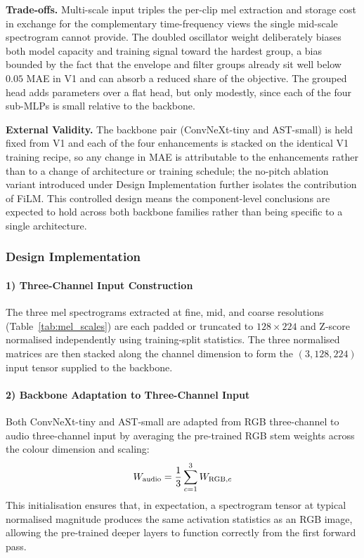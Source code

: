 \par \vspace{0.3cm}
\noindent\textbf{Trade-offs.} Multi-scale input triples the per-clip mel extraction and storage cost in exchange for the complementary time-frequency views the single mid-scale spectrogram cannot provide. The doubled oscillator weight deliberately biases both model capacity and training signal toward the hardest group, a bias bounded by the fact that the envelope and filter groups already sit well below $0.05$ MAE in V1 and can absorb a reduced share of the objective. The grouped head adds parameters over a flat head, but only modestly, since each of the four sub-MLPs is small relative to the backbone.

\par \vspace{0.3cm}
\noindent\textbf{External Validity.} The backbone pair (ConvNeXt-tiny and AST-small) is held fixed from V1 and each of the four enhancements is stacked on the identical V1 training recipe, so any change in MAE is attributable to the enhancements rather than to a change of architecture or training schedule; the no-pitch ablation variant introduced under Design Implementation further isolates the contribution of FiLM. This controlled design means the component-level conclusions are expected to hold across both backbone families rather than being specific to a single architecture.

\subsubsection{Design Implementation}

\paragraph{1) Three-Channel Input Construction}
The three mel spectrograms extracted at fine, mid, and coarse resolutions (Table~\ref{tab:mel_scales}) are each padded or truncated to $128 \times 224$ and Z-score normalised independently using training-split statistics. The three normalised matrices are then stacked along the channel dimension to form the $(3, 128, 224)$ input tensor supplied to the backbone.

\paragraph{2) Backbone Adaptation to Three-Channel Input}
Both ConvNeXt-tiny and AST-small are adapted from RGB three-channel to audio three-channel input by averaging the pre-trained RGB stem weights across the colour dimension and scaling:
\begin{equation}
    W_{\text{audio}} = \frac{1}{3}\sum_{c=1}^{3} W_{\text{RGB},c}
    \label{eq:weight_adapt}\eqname{RGB-to-audio stem weight adaptation}
\end{equation}
This initialisation ensures that, in expectation, a spectrogram tensor at typical normalised magnitude produces the same activation statistics as an RGB image, allowing the pre-trained deeper layers to function correctly from the first forward pass.


